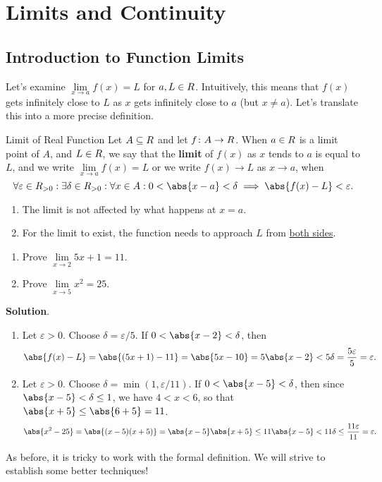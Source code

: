 \chapter{Limits and Continuity}
\section{Introduction to Function Limits}
Let's examine $ \lim\limits_{{x} \to {a}}f(x)=L $ for $ a,L\in\relax{R} $.
Intuitively, this means that $ f(x) $ gets infinitely close to $ L $
as $ x $ gets infinitely close to $ a $ (but $ x\ne a $). Let's translate this
into a more precise definition.
\begin{Definition}{Limit of Real Function}{}
    Let $ A\subseteq\relax{R} $ and let $ f\colon A\to \relax{R} $. When $ a\in\relax{R} $ is a limit point of $ A $,
    and $ L\in\relax{R} $, we say that the \textbf{limit} of $ f(x) $ as $ x $ tends to $ a $ is equal to $ L $,
    and we write $ \lim\limits_{{x} \to {a}}f(x)=L $ or we write $ f(x)\to L $ as $ x\to a $, when
    \[ \forall \varepsilon\in\R_{>0}:\exists \delta\in\R_{>0}:\forall x\in A: 0<\abs{x-a}<\delta\implies \abs{f(x)-L}<\varepsilon. \]
\end{Definition}
\begin{Remark}{}{}
    \begin{enumerate}[(1)]
        \item The limit is not affected by what happens at $ x=a $.
        \item For the limit to exist, the function needs to approach $ L $ from \underline{both sides}.
    \end{enumerate}
\end{Remark}
\begin{Example}{}{}
    \begin{enumerate}[(1)]
        \item Prove $ \lim\limits_{{x} \to {2}}5x+1=11 $.
        \item Prove $ \lim\limits_{{x} \to {5}}x^2=25 $.
    \end{enumerate}
    \tcblower{}
    \textbf{Solution}.
    \begin{enumerate}[(1)]
        \item Let $ \varepsilon>0 $. Choose $ \delta=\varepsilon/5 $. If $ 0<\abs{x-2}<\delta $, then
              \[ \abs{f(x)-L}=\abs{(5x+1)-11}=\abs{5x-10}=5\abs{x-2}<5\delta=\frac{5\varepsilon}{5}=\varepsilon. \]
        \item Let $ \varepsilon>0 $. Choose $ \delta=\min(1,\varepsilon/11) $. If $ 0<\abs{x-5}<\delta $, then
              since $ \abs{x-5}<\delta\le 1 $, we have $ 4<x<6 $, so that
              $ \abs{x+5}\le \abs{6+5}=11 $.
              \[ \abs{x^2-25}=\abs{(x-5)(x+5)}=\abs{x-5}\abs{x+5}\le 11\abs{x-5}<11\delta\le \frac{11\varepsilon}{11}=\varepsilon. \]
    \end{enumerate}
\end{Example}
As before, it is tricky to work with the formal definition. We will strive to establish some better techniques!

